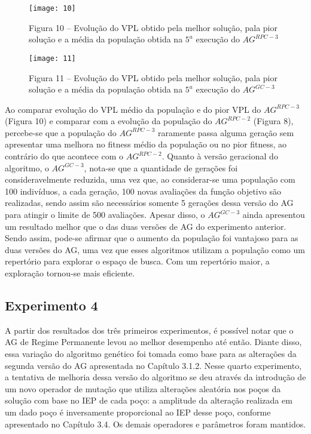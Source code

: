 \begin{figure}[H]
\centering
\texttt{[image: 10]}

\caption{Figura 10 – Evolução do VPL obtido pela melhor solução, pala pior solução e a média da população obtida na $5^a$ execução do $AG^{RPC-3}$}

\end{figure}

\begin{figure}[H]
\centering
\texttt{[image: 11]}
\caption{Figura 11 – Evolução do VPL obtido pela melhor solução, pala pior solução e a média da população obtida na $5^a$ execução do $AG^{GC-3}$}

\end{figure}

Ao comparar evolução do VPL médio da população e do pior VPL do $AG^{RPC-3}$ (Figura 10) e comparar com a evolução da população do $AG^{RPC-2}$ (Figura 8), percebe-se que a população do $AG^{RPC-3}$ raramente passa alguma geração sem apresentar uma melhora no fitness médio da população ou no pior fitness, ao contrário do que acontece com o $AG^{RPC-2}$. Quanto à versão geracional do algoritmo, o $AG^{GC-3}$, nota-se que a quantidade de gerações foi consideravelmente reduzida, uma vez que, ao considerar-se uma população com 100 indivíduos, a cada geração, 100 novas avaliações da função objetivo são realizadas, sendo assim são necessários somente 5 gerações dessa versão do AG para atingir o limite de 500 avaliações. Apesar disso, o $AG^{GC-3}$ ainda apresentou um resultado melhor que o das duas versões de AG do experimento anterior. Sendo assim, pode-se afirmar que o aumento da população foi vantajoso para as duas versões do AG, uma vez que esses algoritmos utilizam a população como um repertório para explorar o espaço de busca. Com um repertório maior, a exploração tornou-se mais eficiente.

\subsection{Experimento 4}

A partir dos resultados dos três primeiros experimentos, é possível notar que o AG de Regime Permanente levou ao melhor desempenho até então. Diante disso, essa variação do algoritmo genético foi tomada como base para as alterações da segunda versão do AG apresentada no Capítulo 3.1.2.  Nesse quarto experimento, a tentativa de melhoria dessa versão do algoritmo se deu através da introdução de um novo operador de mutação que utiliza alterações aleatória nos poços da solução com base no IEP de cada poço: a amplitude da alteração realizada em um dado poço é inversamente proporcional ao IEP desse poço, conforme apresentado no Capítulo 3.4. Os demais operadores e parâmetros foram mantidos.

